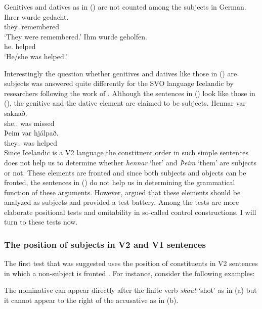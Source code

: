 Genitives and datives as in () are not counted among the subjects in German.
\eal
\ex 
\gll Ihrer       wurde gedacht.\\
     they.\GEN{} \AUX{} remembered\\\german
\glt `They were remembered.'
\ex 
\gll Ihm       wurde  geholfen.\\
     he.\DAT{} \AUX{} helped\\
\glt `He/she was helped.'
\zl

Interestingly the question whether genitives and datives like those in () are subjects was
answered quite differently for the SVO language Icelandic by researchers following the work of
\citet*{ZMT85a}. Although the sentences in () look like those in (), the genitive and
the dative element are claimed to be subjects.
\eal
\label{ex-subject-icelandic-passive-v2}
\ex 
\gll Hennar var saknað.\\
     she.\SG.\GEN{} was missed\\\icelandic
\ex 
\gll Þeim            var hjálpað.\\
     they.\PL.\DAT{} was helped\\
\zl
Since Icelandic is a V2 language the constituent order in such simple sentences does not help us to
determine whether \emph{hennar} `her' and \emph{Þeim} `them' are subjects or not. These elements are
fronted and since both subjects and objects can be fronted, the sentences in () do not help
us in determining the grammatical function of these arguments. However, \citet*{ZMT85a} argued that
these elements should be analyzed as subjects and provided a test battery. Among the tests are more
elaborate positional tests and omitability in so-called control constructions. I will turn to these
tests now.


\subsubsection{The position of subjects in V2 and V1 sentences}


The first test that was suggested uses the position of constituents in V2 sentences in which a
non-subject is fronted \citep*[Section~2.3]{ZMT85a}. For instance, consider the following examples:

\eal
\zl
The nominative can appear directly after the finite verb \emph{skaut} `shot' as in (a) but it
cannot appear to the right of the accusative as in (b).

